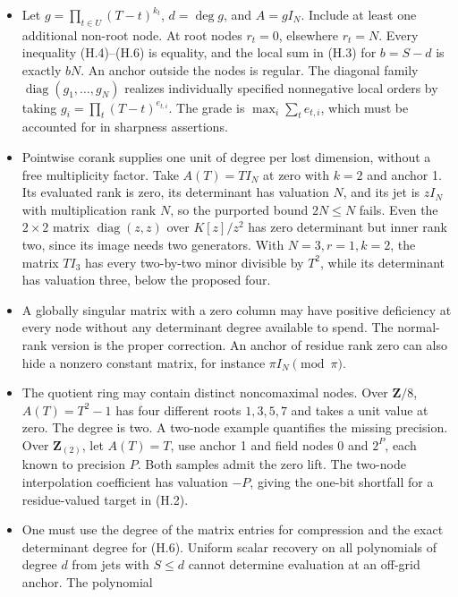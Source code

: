 \documentclass[
  11pt,
]{article}
\providecommand{\tightlist}{%
  \setlength{\itemsep}{0pt}\setlength{\parskip}{0pt}}
\begin{document}
\begin{itemize}
\tightlist
\item
  Let \(g=\prod_{t\in U}(T-t)^{k_t}\), \(d=\deg g\), and \(A=gI_N\).
  Include at least one additional non-root node. At root nodes
  \(r_t=0\), elsewhere \(r_t=N\). Every inequality (H.4)--(H.6) is
  equality, and the local sum in (H.3) for \(b=S-d\) is exactly \(bN\).
  An anchor outside the nodes is regular. The diagonal family
  \(\operatorname{diag}(g_1,\ldots,g_N)\) realizes individually
  specified nonnegative local orders by taking
  \(g_i=\prod_t(T-t)^{e_{t,i}}\). The grade is \(\max_i\sum_t e_{t,i}\),
  which must be accounted for in sharpness assertions.
\item
  Pointwise corank supplies one unit of degree per lost dimension,
  without a free multiplicity factor. Take \(A(T)=TI_N\) at zero with
  \(k=2\) and anchor 1. Its evaluated rank is zero, its determinant has
  valuation \(N\), and its jet is \(zI_N\) with multiplication rank
  \(N\), so the purported bound \(2N\le N\) fails. Even the \(2\times2\)
  matrix \(\operatorname{diag}(z,z)\) over \(K[z]/z^2\) has zero
  determinant but inner rank two, since its image needs two generators.
  With \(N=3,r=1,k=2\), the matrix \(TI_3\) has every two-by-two minor
  divisible by \(T^2\), while its determinant has valuation three, below
  the proposed four.
\item
  A globally singular matrix with a zero column may have positive
  deficiency at every node without any determinant degree available to
  spend. The normal-rank version is the proper correction. An anchor of
  residue rank zero can also hide a nonzero constant matrix, for
  instance \(\pi I_N\pmod\pi\).
\item
  The quotient ring may contain distinct noncomaximal nodes. Over
  \(\mathbf Z/8\), \(A(T)=T^2-1\) has four different roots \(1,3,5,7\)
  and takes a unit value at zero. The degree is two. A two-node example
  quantifies the missing precision. Over \(\mathbf Z_{(2)}\), let
  \(A(T)=T\), use anchor 1 and field nodes 0 and \(2^P\), each known to
  precision \(P\). Both samples admit the zero lift. The two-node
  interpolation coefficient has valuation \(-P\), giving the one-bit
  shortfall for a residue-valued target in (H.2).
\item
  One must use the degree of the matrix entries for compression and the
  exact determinant degree for (H.6). Uniform scalar recovery on all
  polynomials of degree \(d\) from jets with \(S\le d\) cannot determine
  evaluation at an off-grid anchor. The polynomial

\end{itemize}
\end{document}
